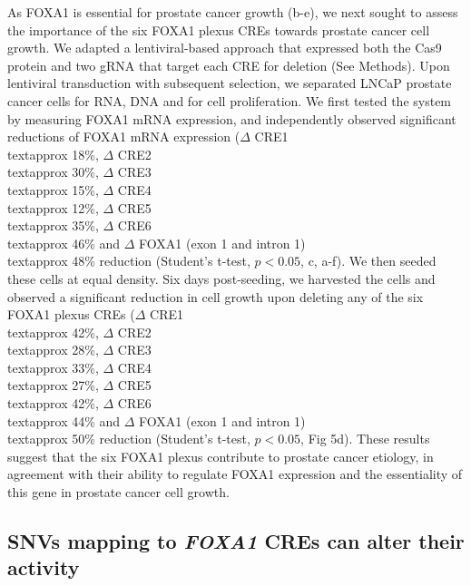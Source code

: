 As FOXA1 is essential for prostate cancer growth (b-e), we next sought to assess the importance of the six FOXA1 plexus CREs towards prostate cancer cell growth.
We adapted a lentiviral-based approach that expressed both the Cas9 protein and two gRNA that target each CRE for deletion (See Methods).
Upon lentiviral transduction with subsequent selection, we separated LNCaP prostate cancer cells for RNA, DNA and for cell proliferation.
We first tested the system by measuring FOXA1 mRNA expression, and independently observed significant reductions of FOXA1 mRNA expression ($\Delta$ CRE1 \\textapprox 18\%, $\Delta$ CRE2 \\textapprox 30\%, $\Delta$ CRE3 \\textapprox 15\%, $\Delta$ CRE4 \\textapprox 12\%, $\Delta$ CRE5 \\textapprox 35\%, $\Delta$ CRE6 \\textapprox 46\% and $\Delta$ FOXA1 (exon 1 and intron 1) \\textapprox 48\% reduction (Student's t-test, $p<0.05$, c, a-f).
We then seeded these cells at equal density.
Six days post-seeding, we harvested the cells and observed a significant reduction in cell growth upon deleting any of the six FOXA1 plexus CREs ($\Delta$ CRE1 \\textapprox 42\%, $\Delta$ CRE2 \\textapprox 28\%, $\Delta$ CRE3 \\textapprox 33\%, $\Delta$ CRE4 \\textapprox 27\%, $\Delta$ CRE5 \\textapprox 42\%, $\Delta$ CRE6 \\textapprox 44\% and $\Delta$ FOXA1 (exon 1 and intron 1) \\textapprox 50\% reduction (Student's t-test, $p<0.05$, Fig 5d).
These results suggest that the six FOXA1 plexus contribute to prostate cancer etiology, in agreement with their ability to regulate FOXA1 expression and the essentiality of this gene in prostate cancer cell growth.

\subsection{SNVs mapping to \emph{FOXA1} CREs can alter their activity}

